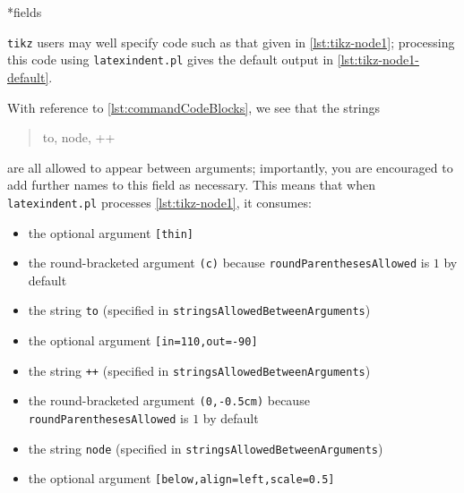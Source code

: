 \documentclass[10pt]{article}
\begin{document}
*{fields}
 \begin{example}
 \texttt{tikz} users may well specify code such as that given in
 \cref{lst:tikz-node1}; processing this code using
 \texttt{latexindent.pl} gives the default output in \cref{lst:tikz-node1-default}.

 \begin{cmhtcbraster}
 \end{cmhtcbraster}

 With reference to \vref{lst:commandCodeBlocks}, we see that the strings
 \begin{quote}
  to, node, ++
 \end{quote}
 are all allowed to appear between arguments; importantly, you are encouraged to add
 further names to this field as necessary. This means that when \texttt{latexindent.pl}
 processes \cref{lst:tikz-node1}, it consumes:
 \begin{itemize}
  \item the optional argument \lstinline![thin]!
  \item the round-bracketed argument \lstinline!(c)! because
        \texttt{roundParenthesesAllowed} is $1$ by default
  \item the string \lstinline!to! (specified in \texttt{stringsAllowedBetweenArguments})
  \item the optional argument \lstinline![in=110,out=-90]!
  \item the string \lstinline!++! (specified in \texttt{stringsAllowedBetweenArguments})
  \item the round-bracketed argument \lstinline!(0,-0.5cm)! because
        \texttt{roundParenthesesAllowed} is $1$ by default
  \item the string \lstinline!node! (specified in
        \texttt{stringsAllowedBetweenArguments})
  \item the optional argument \lstinline![below,align=left,scale=0.5]!
 \end{itemize}
 \end{example}
\end{document}
